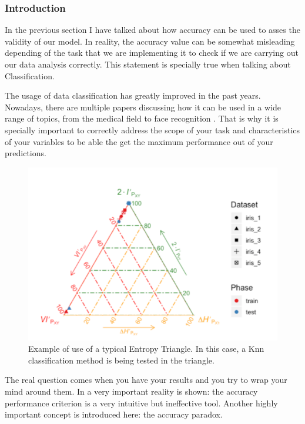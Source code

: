 \subsubsection{Introduction}

In the previous section I have talked about how accuracy can be used to asses the validity of our model. In reality, the accuracy value can be somewhat misleading depending of the task that we are implementing it to check if we are carrying out our data analysis correctly. This statement is specially true when talking about Classification.\par

The usage of data classification has greatly improved in the past years. Nowadays, there are multiple papers discussing how it can be used in a wide range of topics, from the medical field \cite{Medical_Classification} to face recognition \cite{Balaban_2015} . That is why it is specially important to correctly address the scope of your task and characteristics of your variables to be able the get the maximum performance out of your predictions.\par

\begin{figure}[H]
 \centering
  \includegraphics[width=15cm]{Figuras_tfg/Example_ET}
  \caption{Example of use of a typical Entropy Triangle. In this case, a Knn classification method is being tested in the triangle.}
 \label{fig:figure_example_et}
\end{figure} 

The real question comes when you have your results and you try to wrap your mind around them. In \cite{val:pel:14a} a very important reality is shown: the accuracy performance criterion is a very intuitive but ineffective tool. Another highly important concept is introduced here: the accuracy paradox.\par  

